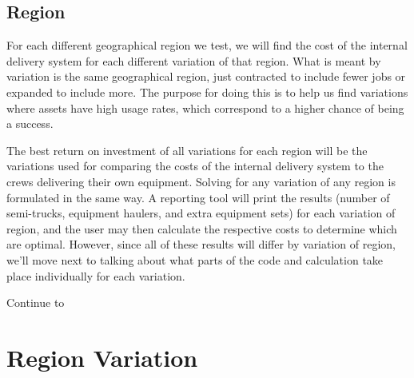 \documentclass[letterpaper,10pt,english]{sphinxmanual}
\begin{document}
\noindent{}

\noindent{}


\section{Region}
\label{\detokenize{main:region}}
For each different geographical region we test, we will find the cost of the
internal delivery system for each different variation of that region. What is
meant by variation is the same geographical region, just contracted to include
fewer jobs or expanded to include more. The purpose for doing this is to help
us find variations where assets have high usage rates, which correspond to a
higher chance of being a success.

The best return on investment of all variations for each region will be the
variations used for comparing the costs of the internal delivery system to
the crews delivering their own equipment. Solving for any variation of any
region is formulated in the same way. A reporting tool will print the results
(number of semi-trucks, equipment haulers, and extra equipment sets) for
each variation of region, and the user may then calculate the respective
costs to determine which are optimal. However, since all of these results
will differ by variation of region, we'll move next to talking about what
parts of the code and calculation take place individually for each variation.

Continue to {\hyperref[\detokenize{variation:variation}]{}}


\chapter{Region Variation}
\label{\detokenize{variation:region-variation}}\label{\detokenize{variation::doc}}\label{\detokenize{variation:variation}}
\end{document}

